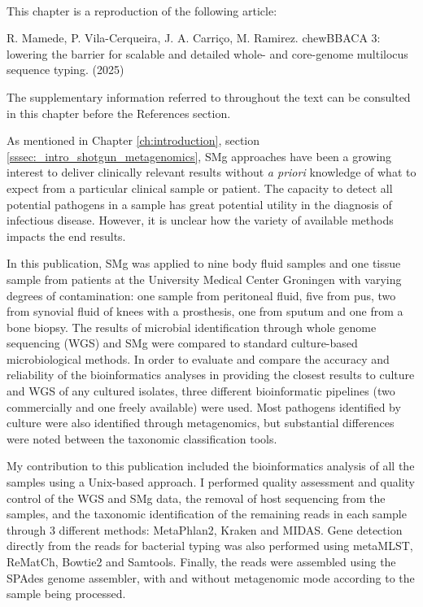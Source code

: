 \mbox{}\\
\vspace{8cm}

This chapter is a reproduction of the following article:

R. Mamede, P. Vila-Cerqueira, J. A. Carriço, M. Ramirez. chewBBACA 3: lowering the barrier for scalable and detailed whole- and core-genome multilocus sequence typing. (2025)



The supplementary information referred to throughout the text can be consulted in this chapter before the References section. 

As mentioned in Chapter \ref{ch:introduction}, section \ref{sssec:_intro_shotgun_metagenomics}, \ac{SMg} approaches have been a growing interest to deliver clinically relevant results without \textit{a priori} knowledge of what to expect from a particular clinical sample or patient. 
The capacity to detect all potential pathogens in a sample has great potential utility in the diagnosis of infectious disease. 
However, it is unclear how the variety of available methods impacts the end results.

In this publication, \ac{SMg} was applied to nine body fluid samples and one tissue sample from patients at the University Medical Center Groningen with varying degrees of contamination: one sample from peritoneal fluid, five from pus, two from synovial fluid of knees with a prosthesis, one from sputum and one from a bone biopsy. The results of microbial identification through whole genome sequencing (\ac{WGS}) and \ac{SMg} were compared to standard culture-based microbiological methods. 
In order to evaluate and compare the accuracy and reliability of the bioinformatics analyses in providing the closest results to culture and \ac{WGS} of any cultured isolates, three different bioinformatic pipelines (two commercially and one freely available) were used. Most pathogens identified by culture were also identified through metagenomics, but substantial differences were noted between the taxonomic classification tools. 

My contribution to this publication included the bioinformatics analysis of all the samples using a Unix-based approach. I performed quality assessment and quality control of the \ac{WGS} and \ac{SMg} data, the removal of host sequencing from the samples, and the taxonomic identification of the remaining reads in each sample through 3 different methods: MetaPhlan2, Kraken and MIDAS. Gene detection directly from the reads for bacterial typing was also performed using metaMLST, ReMatCh, Bowtie2 and Samtools. Finally, the reads were assembled using the SPAdes genome assembler, with and without metagenomic mode according to the sample being processed. 

